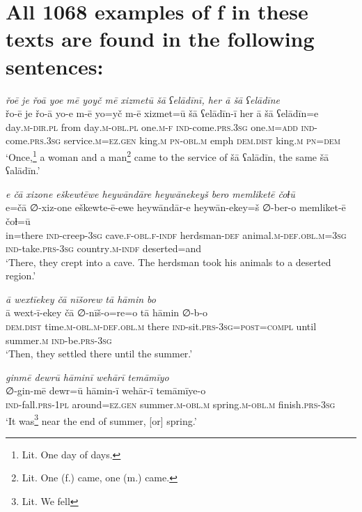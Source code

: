\chapter{All 1068 examples of f in these texts are found in the following sentences:}

\ea \label{ZB.1}
\textit{řoē je řoā yoe mē yoyč mē xizmetū šā ʕelādīnī, her ā šā ʕelādīne} \\ 
\gll řo-ē je řo-ā yo-e m-ē yo=yč m-ē xizmet=ū šā ʕelādīn-ī her ā šā ʕelādīn=e \\ 
 day\textsc{.m}\textsc{-dir}\textsc{.pl} from day\textsc{.m}\textsc{-obl}\textsc{.pl} one\textsc{.m}\textsc{-f} \textsc{ind-}come\textsc{.prs}\textsc{.3sg} one\textsc{.m}\textsc{=add} \textsc{ind-}come\textsc{.prs}\textsc{.3sg} service\textsc{.m}\textsc{\textsc{=ez.gen}} king\textsc{.m} \textsc{pn}\textsc{-obl}\textsc{.m} emph \textsc{dem.dist} king\textsc{.m} \textsc{pn}\textsc{=dem} \\ 
\glt `Once,\footnote{Lit. One day of days.} a woman and a man\footnote{Lit. One (f.) came, one (m.) came.} came to the service of šā ʕalādīn, the same šā ʕalādīn.'
\z 
 
\ea \label{ZB.5}
\textit{e čā xizone eškewtēwe heywāndāre heywānekeyš bero memliketē čoɫū} \\ 
\gll e=čā ∅-xiz-one eškewte-ē-ewe heywāndār-e heywān-ekey=š ∅-ber-o memliket-ē čoɫ=ū \\ 
 in=there \textsc{ind-}creep\textsc{-3sg} cave\textsc{.f}\textsc{-obl}\textsc{.f}\textsc{-indf} herdsman\textsc{-def} animal\textsc{.m}\textsc{-def}\textsc{.obl}\textsc{.m}\textsc{=3sg} \textsc{ind-}take\textsc{.prs}\textsc{-3sg} country\textsc{.m}\textsc{-indf} deserted=and \\ 
\glt `There, they crept into a cave. The herdsman took his animals to a deserted region.'
\z 
 
\ea \label{ZB.6}
\textit{ā wextīekey čā nīšorew tā hāmin bo} \\ 
\gll ā wext-ī-ekey čā ∅-nīš-o=re=o tā hāmin ∅-b-o \\ 
 \textsc{dem.dist} time\textsc{.m}\textsc{-obl}\textsc{.m}\textsc{-def}\textsc{.obl}\textsc{.m} there \textsc{ind-}sit\textsc{.prs}\textsc{-3sg}\textsc{=\textsc{post}}\textsc{=compl} until summer\textsc{.m} \textsc{ind-}be\textsc{.prs}\textsc{-3sg} \\ 
\glt `Then, they settled there until the summer.'
\z 
 
\ea \label{ZB.7}
\textit{ginmē dewrū hāminī wehārī temāmīyo} \\ 
\gll ∅-gin-mē dewr=ū hāmin-ī wehār-ī temāmīye-o \\ 
 \textsc{ind-}fall\textsc{.prs}\textsc{-1pl} around\textsc{\textsc{=ez.gen}} summer\textsc{.m}\textsc{-obl}\textsc{.m} spring\textsc{.m}\textsc{-obl}\textsc{.m} finish\textsc{.prs}\textsc{-3sg} \\ 
\glt `It was\footnote{Lit. We fell} near the end of summer, [or] spring.'
\z 
 
